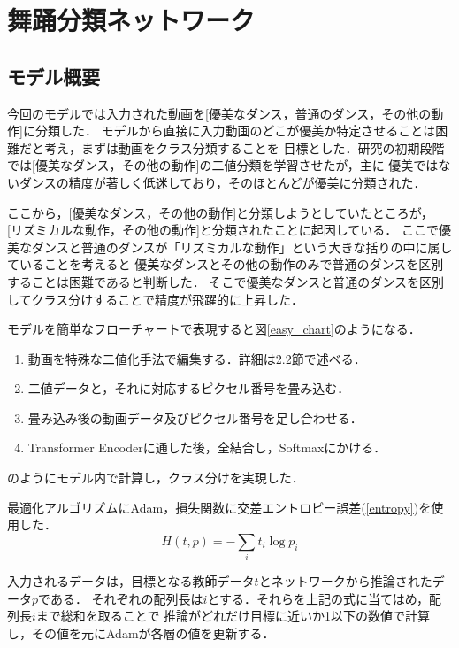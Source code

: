 \section{舞踊分類ネットワーク}

\subsection{モデル概要}
今回のモデルでは入力された動画を[優美なダンス，普通のダンス，その他の動作]に分類した．
モデルから直接に入力動画のどこが優美か特定させることは困難だと考え，まずは動画をクラス分類することを
目標とした．研究の初期段階では[優美なダンス，その他の動作]の二値分類を学習させたが，主に
優美ではないダンスの精度が著しく低迷しており，そのほとんどが優美に分類された．

ここから，[優美なダンス，その他の動作]と分類しようとしていたところが，
[リズミカルな動作，その他の動作]と分類されたことに起因している．
ここで優美なダンスと普通のダンスが「リズミカルな動作」という大きな括りの中に属していることを考えると
優美なダンスとその他の動作のみで普通のダンスを区別することは困難であると判断した．
そこで優美なダンスと普通のダンスを区別してクラス分けすることで精度が飛躍的に上昇した．

モデルを簡単なフローチャートで表現すると図\ref{easy_chart}のようになる．
\begin{enumerate}
  \item 動画を特殊な二値化手法で編集する．詳細は2.2節で述べる．
  \item 二値データと，それに対応するピクセル番号を畳み込む．
  \item 畳み込み後の動画データ及びピクセル番号を足し合わせる．
  \item Transformer Encoderに通した後，全結合し，Softmaxにかける．
\end{enumerate}
のようにモデル内で計算し，クラス分けを実現した．

最適化アルゴリズムにAdam\cite{adam}，損失関数に交差エントロピー誤差(\ref{entropy})を使用した．
\begin{equation}
  H(t, p) = -\sum_{i}t_i\log p_i
  \label{entropy}
\end{equation}

入力されるデータは，目標となる教師データ$t$とネットワークから推論されたデータ$p$である．
それぞれの配列長は$i$とする．それらを上記の式に当てはめ，配列長$i$まで総和を取ることで
推論がどれだけ目標に近いか1以下の数値で計算し，その値を元にAdamが各層の値を更新する．
\clearpage

